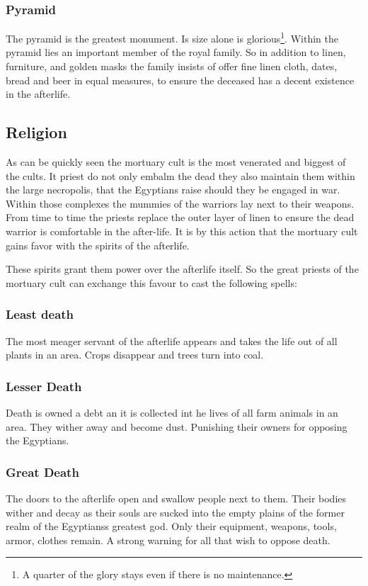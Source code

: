 \documentclass[a4paper]{book}
\begin{document}
		\subsubsection{Pyramid}
			The pyramid is the greatest monument.
			Is size alone is glorious\footnote{
				A quarter of the glory stays even if there is no maintenance.
			}.
			Within the pyramid lies an important member of the royal family.
			So in addition to linen, furniture, and golden masks
			the family insists of offer fine linen cloth, dates, bread and beer
			in equal measures, to ensure the deceased has a decent  existence
			in the afterlife.


	\subsection{Religion}
		As can be quickly seen the mortuary cult is the most venerated and biggest of the cults.
		It priest do not only embalm the dead they also maintain them within the large necropolis,
		that the \gls{Egyptians} raise should they be engaged in war.
		Within those complexes the mummies of the warriors lay next to their weapons.
		From time to time the priests replace the outer layer of linen to ensure the dead warrior
		is comfortable in the after-life.
		It is by this action that the mortuary cult gains favor with the spirits of the afterlife.

		These spirits grant them power over the afterlife itself.
		So the great priests of the mortuary cult can exchange this favour to cast the following spells:

		\subsubsection{Least death}
			The most meager servant of the afterlife appears and takes the life out of all plants
			in an area.
			Crops disappear and trees turn into coal.

		\subsubsection{Lesser Death}
			Death is owned a debt an it is collected int he lives of all farm animals
			in an area.
			They wither away and become dust.
			Punishing their owners for opposing the \gls{Egyptians}.

		\subsubsection{Great Death}
			The doors to the afterlife open and swallow people next to them.
			Their bodies wither and decay as their souls are sucked into the empty plains
			of the former realm of the \gls{Egyptians}s greatest god.
			Only their equipment, weapons, tools, armor, clothes remain.
			A strong warning for all that wish to oppose death.
\end{document}
